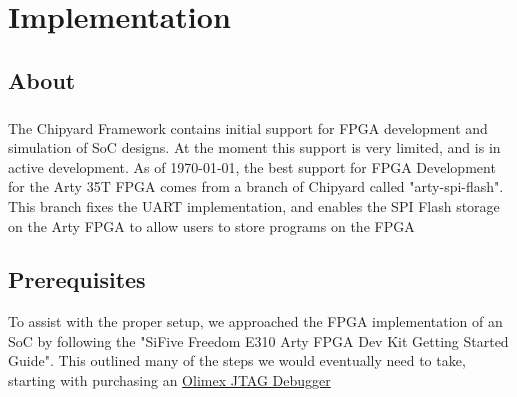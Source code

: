 \chapter{\texorpdfstring{}{FPGA} Implementation}\label{chap:FPGA_Implementation}

\section{About}\label{sec:About}
\paragraph{}The Chipyard Framework contains initial support for FPGA development and simulation of SoC designs. 
At the moment this support is very limited, and is in active development. 
As of \today, the best support for FPGA Development for the Arty 35T FPGA comes from a branch of Chipyard called "arty-spi-flash". 
This branch fixes the UART implementation, and enables the SPI Flash storage on the Arty FPGA to allow users to store programs on the FPGA
\section{Prerequisites}\label{sec:Prerequisites}
To assist with the proper setup, we approached the FPGA implementation of an SoC by following the "SiFive Freedom E310 Arty FPGA Dev Kit Getting Started Guide". 
This outlined many of the steps we would eventually need to take, starting with purchasing an \href{https://www.digikey.com/en/products/detail/olimex-ltd/ARM-USB-TINY-H/3471388}{Olimex JTAG Debugger}~\cite{OlimexJTAG}

